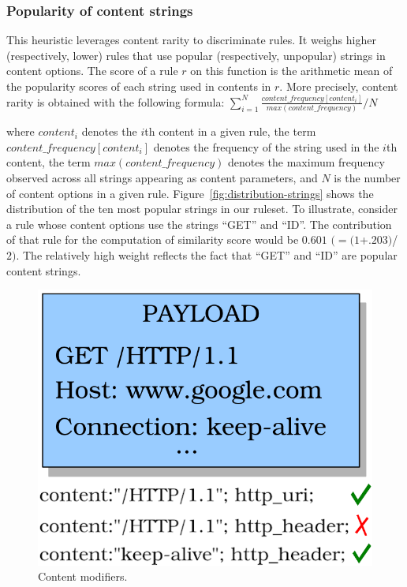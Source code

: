 \documentclass[conference]{IEEEtran}
\begin{document}

\subsubsection{Popularity of content strings} 
This heuristic leverages content rarity to discriminate rules. It
weighs higher (respectively, lower) rules that use popular
(respectively, unpopular) strings in content options. The score of a
rule $r$ on this function is the arithmetic mean of the popularity
scores of each string used in contents in $r$. More precisely, content
rarity is obtained with the following formula:
\indent
$\sum_{i=1}^{N}\frac{\mathit{content\_frequency[content_i]}}{\mathit{max(content\_frequency)}}/N$

\noindent
where $\mathit{content_i}$ denotes the $i$th content in a given
rule, the term $\mathit{content\_frequency[\mathit{content_i}]}$
denotes the frequency of the string used in the $i$th content, the
term $\mathit{max(content\_frequency)}$ denotes the maximum frequency
observed across all strings appearing as content parameters, and $N$
is the number of content options in a given
rule. Figure~\ref{fig:distribution-strings} shows the distribution of
the ten most popular strings in our ruleset. To illustrate, consider a
rule whose content options use the strings ``GET'' and ``ID''. The
contribution of that rule for the computation of similarity score
would be $0.601$ $(=(1$+$.203)$/$2)$. The relatively high weight
reflects the fact that ``GET'' and ``ID'' are popular content strings.

\begin{figure}
  \vspace{-2ex}
\centering
\includegraphics[scale=0.6]{figs/http_header-example.png}
\vspace{-1ex}
\caption{Content modifiers.}
\label{fig:http-header-example}
\end{figure}
\end{document}

